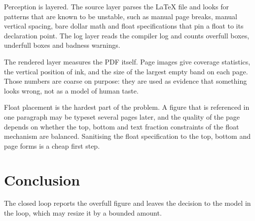 \documentclass[10pt,a4paper]{article}
\begin{document}
Perception is layered. The source layer parses the LaTeX file and looks for patterns that are known to be unstable, such as manual page breaks, manual vertical spacing, bare dollar math and float specifications that pin a float to its declaration point. The log layer reads the compiler log and counts overfull boxes, underfull boxes and badness warnings.

The rendered layer measures the PDF itself. Page images give coverage statistics, the vertical position of ink, and the size of the largest empty band on each page. Those numbers are coarse on purpose: they are used as evidence that something looks wrong, not as a model of human taste.

Float placement is the hardest part of the problem. A figure that is referenced in one paragraph may be typeset several pages later, and the quality of the page depends on whether the top, bottom and text fraction constraints of the float mechanism are balanced. Sanitising the float specification to the top, bottom and page forms is a cheap first step.


\section{Conclusion}
The closed loop reports the overfull figure and leaves the decision to the model
in the loop, which may resize it by a bounded amount.
\end{document}
